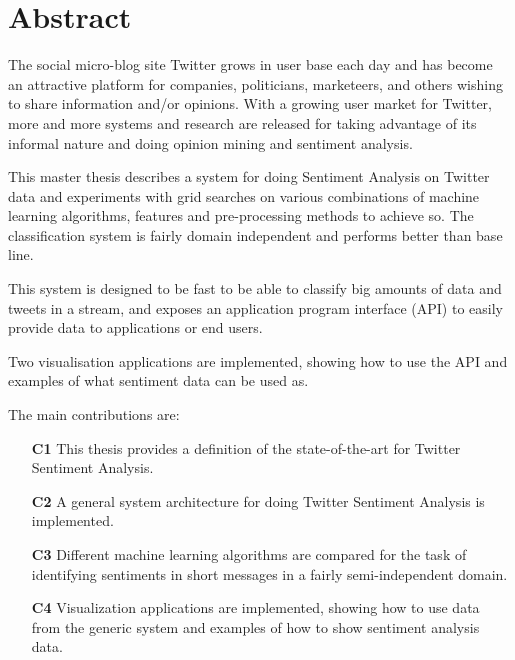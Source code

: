 \section*{Abstract}

The social micro-blog site Twitter grows in user base each day and has become an attractive platform for companies, politicians, marketeers, and others wishing to share information and/or opinions. With a growing user market for Twitter, more and more systems and research are released for taking advantage of its informal nature and doing opinion mining and sentiment analysis. 

This master thesis describes a system for doing Sentiment Analysis on Twitter data and experiments with grid searches on various combinations of machine learning algorithms, features and pre-processing methods to achieve so. The classification system is fairly domain independent and performs better than base line. 

This system is designed to be fast to be able to classify big amounts of data and tweets in a stream, and exposes an application program interface (API) to easily provide data to applications or end users. 

Two visualisation applications are implemented, showing how to use the API and examples of what sentiment data can be used as.

The main contributions are: 

\begin{itemize}
\item[\textbf{C1}] This thesis provides a definition of the state-of-the-art for Twitter Sentiment Analysis.

\item[\textbf{C2}] A general system architecture for doing Twitter Sentiment Analysis is implemented. 

\item[\textbf{C3}] Different machine learning algorithms are compared for the task of identifying sentiments in short messages in a fairly semi-independent domain.

\item[\textbf{C4}] Visualization applications are implemented, showing how to use data from the generic system and examples of how to show sentiment analysis data.
\end{itemize}

\cleardoublepage